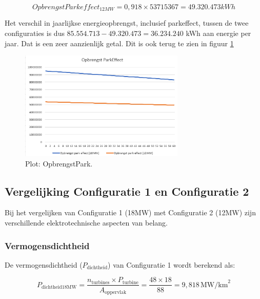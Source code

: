 \begin{equation} \label{eq:17}
OpbrengstParkeffect_{12MW}= 0,918\times 53715367 = 49.320.473 kWh
\end{equation}

Het verschil in jaarlijkse energieopbrengst, inclusief parkeffect, tussen de twee configuraties is dus \(85.554.713 - 49.320.473 = 36.234.240\) kWh aan energie per jaar. Dat is een zeer aanzienlijk getal. Dit is ook terug te zien in figuur \ref{fig:OpbrengstPark}

\begin{figure}[H]
\centering
\includegraphics[width=0.7\textwidth]{IMG/data/overzicht/OpbrengstPark_graph.PNG}
\caption{Plot: OpbrengstPark.}
\label{fig:OpbrengstPark}
\end{figure}

\subsection{Vergelijking Configuratie 1 en Configuratie 2}

Bij het vergelijken van Configuratie 1 (18MW) met Configuratie 2 (12MW) zijn verschillende elektrotechnische aspecten van belang. 

\subsubsection{Vermogensdichtheid}

De vermogensdichtheid (\(P_{\text{dichtheid}}\)) van Configuratie 1 wordt berekend als:

\begin{equation} \label{eq:18}
P_{\text{dichtheid18MW}} = \frac{{n_{\text{turbines}} \times P_{\text{turbine}}}}{{A_{\text{oppervlak}}}} = \frac{{48 \times 18}}{{88}} = 9,818 \, \text{MW/km}^2
\end{equation}

